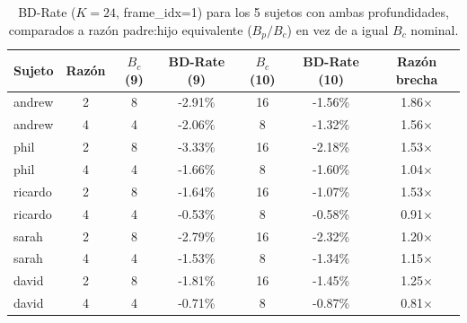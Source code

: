         \begin{table}[H]
            \centering
            \caption{BD-Rate ($K=24$, frame\_idx=1) para los 5 sujetos con ambas profundidades,
            comparados a razón padre:hijo equivalente ($B_p/B_c$) en vez de a igual $B_c$ nominal.}
            \footnotesize
            \begin{tabular}{l|c|cc|cc|c}
                \hline
                \textbf{Sujeto} & \textbf{Razón} & $B_c$ (9) & \textbf{BD-Rate (9)} &
                $B_c$ (10) & \textbf{BD-Rate (10)} & \textbf{Razón brecha} \\
                \hline
                andrew   & 2 & 8 & -2.91\% & 16 & -1.56\% & 1.86$\times$ \\
                andrew   & 4 & 4 & -2.06\% &  8 & -1.32\% & 1.56$\times$ \\
                \hline
                phil     & 2 & 8 & -3.33\% & 16 & -2.18\% & 1.53$\times$ \\
                phil     & 4 & 4 & -1.66\% &  8 & -1.60\% & 1.04$\times$ \\
                \hline
                ricardo  & 2 & 8 & -1.64\% & 16 & -1.07\% & 1.53$\times$ \\
                ricardo  & 4 & 4 & -0.53\% &  8 & -0.58\% & 0.91$\times$ \\
                \hline
                sarah    & 2 & 8 & -2.79\% & 16 & -2.32\% & 1.20$\times$ \\
                sarah    & 4 & 4 & -1.53\% &  8 & -1.34\% & 1.15$\times$ \\
                \hline
                david    & 2 & 8 & -1.81\% & 16 & -1.45\% & 1.25$\times$ \\
                david    & 4 & 4 & -0.71\% &  8 & -0.87\% & 0.81$\times$ \\
                \hline
            \end{tabular}
            \normalsize
            \label{tab:e10_depth_ratio}
        \end{table}

